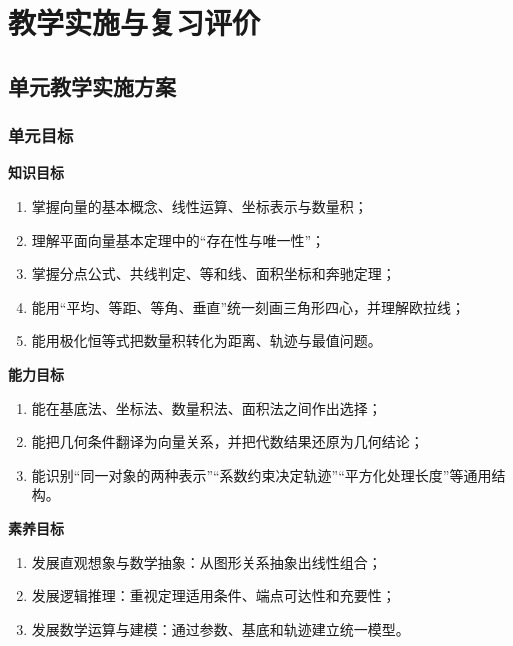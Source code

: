 \documentclass[11pt,a4paper,openany]{ctexbook}
\begin{document}
\part{教学实施与复习评价}

\chapter{单元教学实施方案}

\section{单元目标}
\begin{teachbox}
\textbf{知识目标}
\begin{enumerate}
  \item 掌握向量的基本概念、线性运算、坐标表示与数量积；
  \item 理解平面向量基本定理中的“存在性与唯一性”；
  \item 掌握分点公式、共线判定、等和线、面积坐标和奔驰定理；
  \item 能用“平均、等距、等角、垂直”统一刻画三角形四心，并理解欧拉线；
  \item 能用极化恒等式把数量积转化为距离、轨迹与最值问题。
\end{enumerate}

\textbf{能力目标}
\begin{enumerate}
  \item 能在基底法、坐标法、数量积法、面积法之间作出选择；
  \item 能把几何条件翻译为向量关系，并把代数结果还原为几何结论；
  \item 能识别“同一对象的两种表示”“系数约束决定轨迹”“平方化处理长度”等通用结构。
\end{enumerate}

\textbf{素养目标}
\begin{enumerate}
  \item 发展直观想象与数学抽象：从图形关系抽象出线性组合；
  \item 发展逻辑推理：重视定理适用条件、端点可达性和充要性；
  \item 发展数学运算与建模：通过参数、基底和轨迹建立统一模型。
\end{enumerate}
\end{teachbox}
\end{document}
